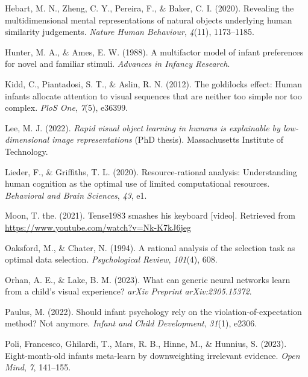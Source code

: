 \documentclass[10pt, letterpaper]{article}
\newenvironment{CSLReferences}%
  {}%
  {\par}
\begin{document}
\begin{CSLReferences}{1}{0}
\leavevmode{}%
Hebart, M. N., Zheng, C. Y., Pereira, F., \& Baker, C. I. (2020).
Revealing the multidimensional mental representations of natural objects
underlying human similarity judgements. \emph{Nature Human Behaviour},
\emph{4}(11), 1173--1185.

\leavevmode{}%
Hunter, M. A., \& Ames, E. W. (1988). A multifactor model of infant
preferences for novel and familiar stimuli. \emph{Advances in Infancy
Research}.

\leavevmode{}%
Kidd, C., Piantadosi, S. T., \& Aslin, R. N. (2012). The goldilocks
effect: Human infants allocate attention to visual sequences that are
neither too simple nor too complex. \emph{PloS One}, \emph{7}(5),
e36399.

\leavevmode{}%
Lee, M. J. (2022). \emph{Rapid visual object learning in humans is
explainable by low-dimensional image representations} (PhD thesis).
Massachusetts Institute of Technology.

\leavevmode{}%
Lieder, F., \& Griffiths, T. L. (2020). Resource-rational analysis:
Understanding human cognition as the optimal use of limited
computational resources. \emph{Behavioral and Brain Sciences},
\emph{43}, e1.

\leavevmode{}%
Moon, T. the. (2021). Tense1983 smashes his keyboard {[}video{]}.
Retrieved from \url{https://www.youtube.com/watch?v=Nk-K7kJ6jeg}

\leavevmode{}%
Oaksford, M., \& Chater, N. (1994). A rational analysis of the selection
task as optimal data selection. \emph{Psychological Review},
\emph{101}(4), 608.

\leavevmode{}%
Orhan, A. E., \& Lake, B. M. (2023). What can generic neural networks
learn from a child's visual experience? \emph{arXiv Preprint
arXiv:2305.15372}.

\leavevmode{}%
Paulus, M. (2022). Should infant psychology rely on the
violation-of-expectation method? Not anymore. \emph{Infant and Child
Development}, \emph{31}(1), e2306.

\leavevmode{}%
Poli, Francesco, Ghilardi, T., Mars, R. B., Hinne, M., \& Hunnius, S.
(2023). Eight-month-old infants meta-learn by downweighting irrelevant
evidence. \emph{Open Mind}, \emph{7}, 141--155.


\end{CSLReferences}
\end{document}
